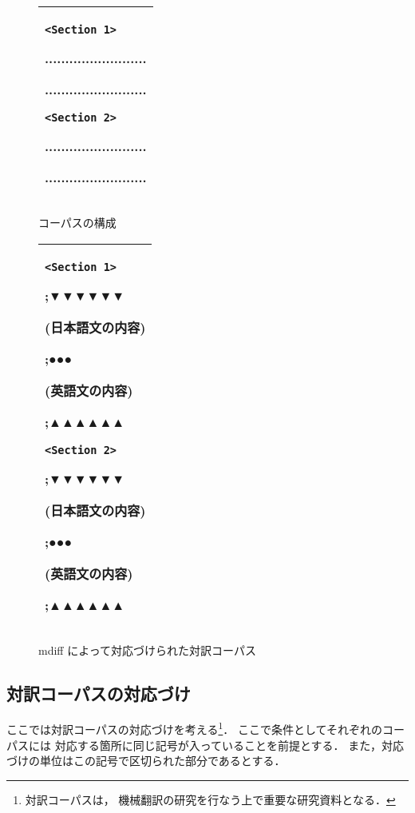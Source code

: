 \begin{figure}[t]
  \begin{center}
    \leavevmode

    \begin{tabular}[h]{|l|}\hline
{\begin{minipage}[h]{4cm}
\verb+<Section 1>+

.........................

.........................

\verb+<Section 2>+

.........................

.........................
\end{minipage}}\\\hline
\end{tabular}

    \caption{コーパスの構成}
    \label{tab:mt_corpus}
  \end{center}
\end{figure}


\begin{figure}[t]
  \begin{center}
    \leavevmode

    \begin{tabular}[h]{|l|}\hline
{\begin{minipage}[h]{4cm}
\verb+<Section 1>+

;▼▼▼▼▼▼

(日本語文の内容)

;●●●

(英語文の内容)

;▲▲▲▲▲▲

\verb+<Section 2>+

;▼▼▼▼▼▼

(日本語文の内容)

;●●●

(英語文の内容)

;▲▲▲▲▲▲
\end{minipage}}\\\hline
\end{tabular}

\caption{mdiff によって対応づけられた対訳コーパス}
\label{tab:mt_corpus_mdiff}
\end{center}
\end{figure}

\subsection{対訳コーパスの対応づけ}
\label{sec:taiyaku}
ここでは対訳コーパスの対応づけを考える\footnote{対訳コーパスは，
機械翻訳\cite{murata_nlc2001,modal2001}の研究を行なう上で重要な研究資料となる．}．
ここで条件としてそれぞれのコーパスには
対応する箇所に同じ記号が入っていることを前提とする．
また，対応づけの単位はこの記号で区切られた部分であるとする．

